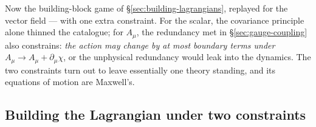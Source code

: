 \documentclass[11pt]{article}
\theoremstyle{plain}
\theoremstyle{definition}
\theoremstyle{remark}
\begin{document}
Now the building-block game of \S\ref{sec:building-lagrangians},
replayed for the vector field --- with one extra constraint. For the
scalar, the covariance principle alone thinned the catalogue; for
$A_\mu$, the redundancy met in \S\ref{sec:gauge-coupling} also
constrains: \emph{the action may change by at most boundary terms under}
$A_\mu \to A_\mu + \partial_\mu\chi$, or the unphysical redundancy would
leak into the dynamics. The two constraints turn out to leave essentially
one theory standing, and its equations of motion are Maxwell's.

\subsection{Building the Lagrangian under two constraints}
\label{sec:building-maxwell}
\end{document}
